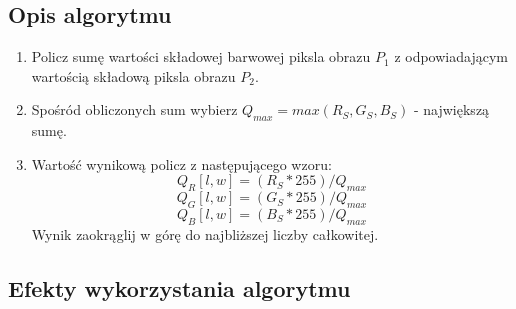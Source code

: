 \documentclass[a4paper,12pt, titlepage]{report}
\begin{document}
\subsection*{Opis algorytmu}
\begin{enumerate}
\item Policz sumę wartości składowej barwowej piksla obrazu \(P_{1}\) z odpowiadającym wartością składową piksla obrazu \(P_{2}\).
\item Spośród obliczonych sum wybierz \(Q_{max}=max(R_{S},G_{S},B_{S})\) - największą sumę.
\item Wartość wynikową policz z następującego wzoru: \[Q_{R}[l,w]=(R_{S}*255)/Q_{max}\]\[Q_{G}[l,w]=(G_{S}*255)/Q_{max}\]\[Q_{B}[l,w]=(B_{S}*255)/Q_{max}\]Wynik zaokrąglij w górę do najbliższej liczby całkowitej.
\end{enumerate}
\subsection*{Efekty wykorzystania algorytmu}
\end{document}
